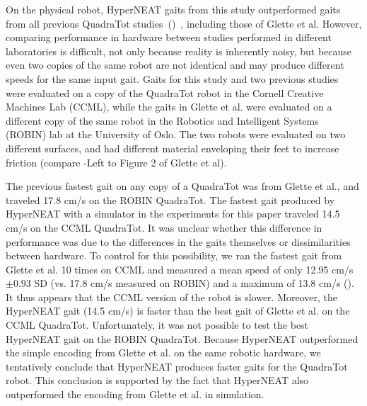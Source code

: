 On the physical robot, HyperNEAT gaits from this study outperformed gaits from all previous QuadraTot studies~()~\cite{yos:clune,glette,haocheng}, including those of Glette et al. 
 However, comparing performance in hardware between studies performed in
different laboratories is difficult, not only because reality is
inherently noisy, but because even two copies of the same robot are
not identical and may produce different speeds for the same input
gait. Gaits for this study and two previous studies~\cite{yos:clune,haocheng} were evaluated on a copy of the QuadraTot robot in the Cornell Creative Machines Lab (CCML), while the gaits in Glette et al. were evaluated on a different copy of the same robot in the Robotics and
Intelligent Systems (ROBIN) lab at the University of Oslo. The two robots were evaluated on two different surfaces, and had different material enveloping their feet to increase friction (compare -Left to Figure 2 of Glette et al). 

The previous fastest gait on any copy of a QuadraTot was from Glette
et al., and traveled 17.8 cm/s on the ROBIN QuadraTot. The
fastest gait produced by HyperNEAT with a simulator in the experiments for this paper traveled 14.5
cm/s on the CCML QuadraTot. It was unclear whether this difference in performance was due to
the differences in the gaits themselves or dissimilarities between
hardware. To control for this possibility, we ran the fastest gait
from Glette et al. 10 times on CCML and measured a mean speed of
only 12.95 cm/s $\pm0.93$ SD (vs. 17.8 cm/s measured on ROBIN) and a maximum of
13.8 cm/s (). It thus appears that the CCML version of the robot is slower. Moreover, the HyperNEAT gait (14.5 cm/s) is faster than the best gait of Glette et al. on the CCML QuadraTot. Unfortunately, it was not possible to test the best HyperNEAT gait on the ROBIN QuadraTot. Because HyperNEAT outperformed the simple encoding from Glette et al. on the same robotic hardware, we tentatively
conclude that HyperNEAT produces faster gaits for the QuadraTot robot. This conclusion is supported by the fact that HyperNEAT also outperformed the encoding from Glette et al. in simulation. 

